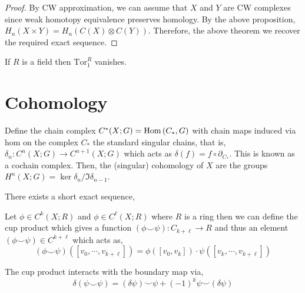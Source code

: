 \documentclass[12pt]{extarticle}
\begin{document}
\begin{proof}
By CW approximation, we can assume that $X$ and $Y$ are CW complexes since weak homotopy equivalence preserves homology. By the above proposition, $H_n(X \times Y) = H_n(C(X) \otimes C(Y))$. Therefore, the above theorem we recover the required exact sequence. 
\end{proof}

\begin{remark}
If $R$ is a field then $\mathrm{Tor}^R_1$ vanishes.
\end{remark}

\section{Cohomology}

\begin{definition}
Define the chain complex $C^{\ast}(X ; G) = \mathrm{Hom}\left( C_{\ast}, G \right)$ with chain maps induced via hom on the complex $C_{\ast}$ the standard singular chains, that is, $\delta_n : C^{n}(X ; G) \to C^{n+1}(X ; G)$ which acts as $\delta(f) = f \circ \partial_{C_{\ast}}$. This is known as a cochain complex. Then, the (singular) cohomology of $X$ are the groups $H^n(X ; G) = \ker{\delta_{n}} / \Im{\delta_{n-1}}$.  
\end{definition}

\begin{theorem}
There exists a short exact sequence,
\begin{center}
\end{center}
\end{theorem}

\begin{definition}
Let $\phi \in C^k(X ; R)$ and $\phi \in C^{\ell}(X ; R)$ where $R$ is a ring then we can define the cup product which gives a function $(\phi \smile \psi) : C_{k + \ell} \to R$ and thus an element $(\phi \smile \psi) \in C^{k + \ell}$ which acts as,
\[ (\phi \smile \psi)([v_0, \cdots, v_{k + \ell}]) = \phi([v_0, v_{k}]) \cdot \psi([v_k, \cdots, v_{k+\ell}]) \] 
\end{definition}

\begin{lemma}
The cup product interacts with the boundary map via,
\[\delta(\psi \smile \psi) = (\delta \psi) \smile \psi + (-1)^k \psi \smile (\delta \psi) \]
\end{lemma}
\end{document}
